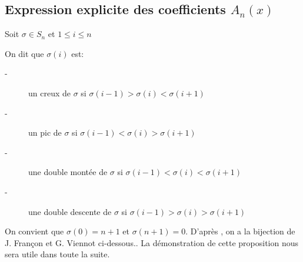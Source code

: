 \subsection{Expression explicite des coefficients $A_{n}(x)$}
Soit $\sigma \in S_{n}$ et $1 \leq i \leq n$\\
\begin{definition}
	\begin{rm}
		On dit que $\sigma(i)$ est:
		\begin{description}
			\item[-] un creux de $\sigma$ si $\sigma (i-1)> \sigma (i)<\sigma (i+1)$
			\item[-] un pic de $\sigma$ si  $\sigma (i-1)<\sigma (i)>\sigma(i+1)$
			\item[-] une double montée de $\sigma$ si $\sigma (i-1)<\sigma (i)<\sigma(i+1)$
			\item[-] une double descente de $\sigma$ si  $\sigma (i-1)>\sigma (i)>\sigma(i+1)$
		\end{description}
	\end{rm}
\end{definition}
On convient que $\sigma (0) = n+1$ et $\sigma (n+1) = 0 $.
D'après \cite{FranconViennot}, on a la bijection de J. Françon et G. Viennot ci-dessous.. La démonstration
de cette proposition nous sera utile dans toute la suite.

